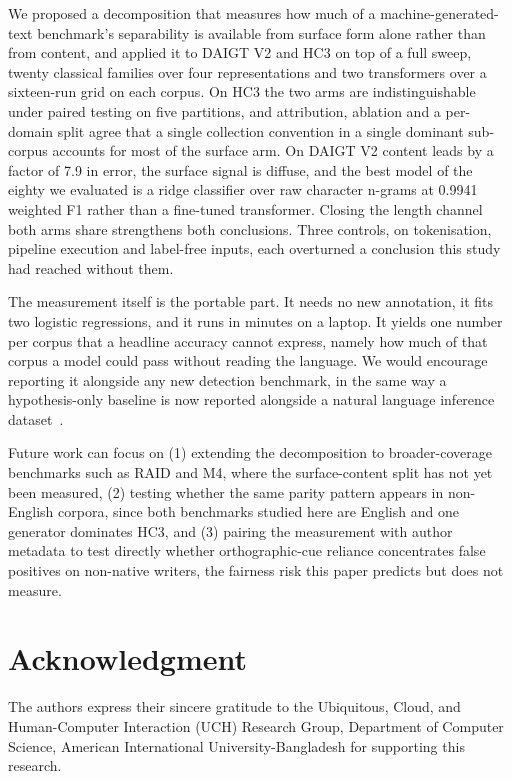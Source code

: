 \documentclass[conference,a4paper]{IEEEtran}
\begin{document}
We proposed a decomposition that measures how much of a machine-generated-text benchmark's separability is available from surface form alone rather than from content, and applied it to DAIGT V2 and HC3 on top of a full sweep, twenty classical families over four representations and two transformers over a sixteen-run grid on each corpus. On HC3 the two arms are indistinguishable under paired testing on five partitions, and attribution, ablation and a per-domain split agree that a single collection convention in a single dominant sub-corpus accounts for most of the surface arm. On DAIGT V2 content leads by a factor of 7.9 in error, the surface signal is diffuse, and the best model of the eighty we evaluated is a ridge classifier over raw character n-grams at 0.9941 weighted F1 rather than a fine-tuned transformer. Closing the length channel both arms share strengthens both conclusions. Three controls, on tokenisation, pipeline execution and label-free inputs, each overturned a conclusion this study had reached without them.

The measurement itself is the portable part. It needs no new annotation, it fits two logistic regressions, and it runs in minutes on a laptop. It yields one number per corpus that a headline accuracy cannot express, namely how much of that corpus a model could pass without reading the language. We would encourage reporting it alongside any new detection benchmark, in the same way a hypothesis-only baseline is now reported alongside a natural language inference dataset~\cite{Poliak2018hypothesis}.

Future work can focus on (1) extending the decomposition to broader-coverage benchmarks such as RAID and M4, where the surface-content split has not yet been measured, (2) testing whether the same parity pattern appears in non-English corpora, since both benchmarks studied here are English and one generator dominates HC3, and (3) pairing the measurement with author metadata to test directly whether orthographic-cue reliance concentrates false positives on non-native writers, the fairness risk this paper predicts but does not measure.

\section*{Acknowledgment}
The authors express their sincere gratitude to the Ubiquitous, Cloud, and Human-Computer Interaction (UCH) Research Group, Department of Computer Science, American International University-Bangladesh for supporting this research.
\end{document}
